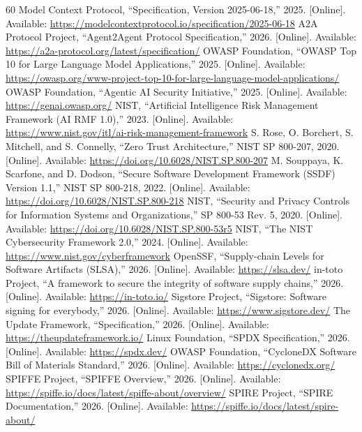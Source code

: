 \documentclass[12pt,journal,onecolumn,draftclsnofoot]{IEEEtran}
\begin{document}
\begin{thebibliography}{60}
 Model Context Protocol, ``Specification, Version 2025-06-18,'' 2025. [Online]. Available: \url{https://modelcontextprotocol.io/specification/2025-06-18}
 A2A Protocol Project, ``Agent2Agent Protocol Specification,'' 2026. [Online]. Available: \url{https://a2a-protocol.org/latest/specification/}
 OWASP Foundation, ``OWASP Top 10 for Large Language Model Applications,'' 2025. [Online]. Available: \url{https://owasp.org/www-project-top-10-for-large-language-model-applications/}
 OWASP Foundation, ``Agentic AI Security Initiative,'' 2025. [Online]. Available: \url{https://genai.owasp.org/}
 NIST, ``Artificial Intelligence Risk Management Framework (AI RMF 1.0),'' 2023. [Online]. Available: \url{https://www.nist.gov/itl/ai-risk-management-framework}
 S. Rose, O. Borchert, S. Mitchell, and S. Connelly, ``Zero Trust Architecture,'' NIST SP 800-207, 2020. [Online]. Available: \url{https://doi.org/10.6028/NIST.SP.800-207}
 M. Souppaya, K. Scarfone, and D. Dodson, ``Secure Software Development Framework (SSDF) Version 1.1,'' NIST SP 800-218, 2022. [Online]. Available: \url{https://doi.org/10.6028/NIST.SP.800-218}
 NIST, ``Security and Privacy Controls for Information Systems and Organizations,'' SP 800-53 Rev. 5, 2020. [Online]. Available: \url{https://doi.org/10.6028/NIST.SP.800-53r5}
 NIST, ``The NIST Cybersecurity Framework 2.0,'' 2024. [Online]. Available: \url{https://www.nist.gov/cyberframework}
 OpenSSF, ``Supply-chain Levels for Software Artifacts (SLSA),'' 2026. [Online]. Available: \url{https://slsa.dev/}
 in-toto Project, ``A framework to secure the integrity of software supply chains,'' 2026. [Online]. Available: \url{https://in-toto.io/}
 Sigstore Project, ``Sigstore: Software signing for everybody,'' 2026. [Online]. Available: \url{https://www.sigstore.dev/}
 The Update Framework, ``Specification,'' 2026. [Online]. Available: \url{https://theupdateframework.io/}
 Linux Foundation, ``SPDX Specification,'' 2026. [Online]. Available: \url{https://spdx.dev/}
 OWASP Foundation, ``CycloneDX Software Bill of Materials Standard,'' 2026. [Online]. Available: \url{https://cyclonedx.org/}
 SPIFFE Project, ``SPIFFE Overview,'' 2026. [Online]. Available: \url{https://spiffe.io/docs/latest/spiffe-about/overview/}
 SPIRE Project, ``SPIRE Documentation,'' 2026. [Online]. Available: \url{https://spiffe.io/docs/latest/spire-about/}

\end{thebibliography}
\end{document}

